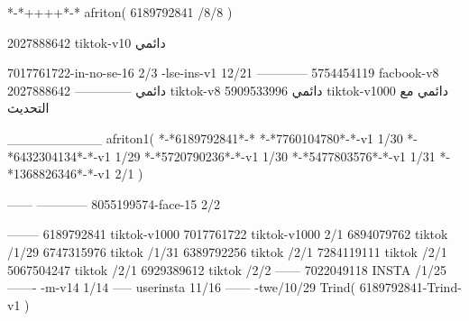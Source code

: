 *-*++++*-*
afriton(
6189792841 /8/8
)

2027888642 tiktok-v10
دائمي

7017761722-in-no-se-16 2/3
-lse-ins-v1 12/21
------------
5754454119 facbook-v8
دائمي
--------------
2027888642 tiktok-v8
دائمي
5909533996 tiktok-v1000
دائمي مع التحديث

__________
afriton1(
*-*6189792841*-*
*-*7760104780*-*-v1 1/30
*-*6432304134*-*-v1 1/29
*-*5720790236*-*-v1 1/30
*-*5477803576*-*-v1 1/31
*-*1368826346*-*-v1 2/1
)

------
------------
8055199574-face-15 2/2

--------
6189792841 tiktok-v1000
7017761722 tiktok-v1000 2/1
6894079762 tiktok /1/29
6747315976 tiktok /1/31
6389792256 tiktok /2/1
7284119111 tiktok /2/1
5067504247 tiktok /2/1
6929389612 tiktok /2/2
------
7022049118 INSTA /1/25
-------
-m-v14 1/14
-----
userinsta 11/16
------
-twe/10/29
Trind(
6189792841-Trind-v1 
)
